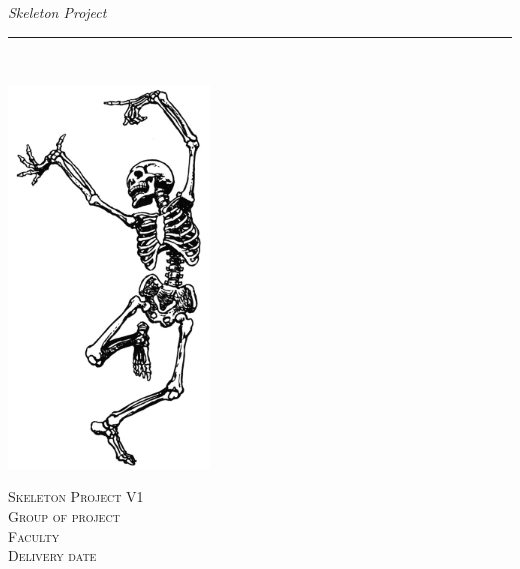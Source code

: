 \thispagestyle{empty}
\begin{flushright}
\vspace{3cm}

\phantom{hul}

\phantom{hul}

\phantom{hul}

\textsl{\Huge Skeleton Project} \\ \vspace{1cm}

\rule{13cm}{3mm} \\ \vspace{1.5cm}
\vspace{1cm}

\includegraphics[width=0.4\textwidth]{4.Construction/pictures/skeleton-cover.jpg}

\vspace{2cm} 
\textsc{\Large Skeleton Project V1 \\
Group of project \\
Faculty\\
Delivery date\\}
\end{flushright}
